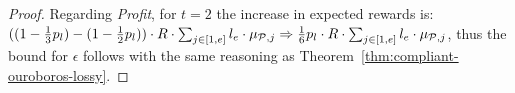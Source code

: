 \begin{proof}
    Regarding \emph{Profit}, for $t = 2$ the increase in expected rewards is:
    $((1 - \frac{1}{3} p_l) - (1 - \frac{1}{2} p_l)) \cdot R \cdot \sum_{j \in [1, e]} l_e \cdot \mu_{\mathcal{P},j} \Rightarrow
    \frac{1}{6} p_l \cdot R \cdot \sum_{j \in [1, e]} l_e \cdot \mu_{\mathcal{P},j}$,
    thus the bound for $\epsilon$ follows with the same reasoning as
    Theorem~\ref{thm:compliant-ouroboros-lossy}.
\end{proof}
